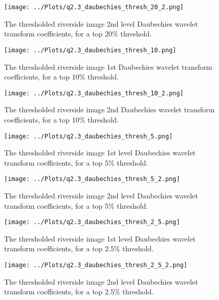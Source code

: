 \documentclass[12pt]{report} %
\begin{document}
\begin{figure}[htbp]
    \centering
    \texttt{[image: ../Plots/q2.3\_daubechies\_thresh\_20\_2.png]}
    \caption{The thresholded riverside image 2nd level Daubechies wavelet transform coefficients, for a top 20\% threshold.}
    \label{fig:thresholded_image20_2}
\end{figure}

\begin{figure}[htbp]
    \centering
    \texttt{[image: ../Plots/q2.3\_daubechies\_thresh\_10.png]}
    \caption{The thresholded riverside image 1st Daubechies wavelet transform coefficients, for a top 10\% threshold.}
    \label{fig:thresholded_image10}
\end{figure}

\begin{figure}[htbp]
    \centering
    \texttt{[image: ../Plots/q2.3\_daubechies\_thresh\_10\_2.png]}
    \caption{The thresholded riverside image 2nd Daubechies wavelet transform coefficients, for a top 10\% threshold.}
    \label{fig:thresholded_image10_2}
\end{figure}

\begin{figure}[htbp]
    \centering
    \texttt{[image: ../Plots/q2.3\_daubechies\_thresh\_5.png]}
    \caption{The thresholded riverside image 1st level Daubechies wavelet transform coefficients, for a top 5\% threshold.}
    \label{fig:thresholded_image5}
\end{figure}

\begin{figure}[htbp]
    \centering
    \texttt{[image: ../Plots/q2.3\_daubechies\_thresh\_5\_2.png]}
    \caption{The thresholded riverside image 2nd level Daubechies wavelet transform coefficients, for a top 5\% threshold.}
    \label{fig:thresholded_image5_2}
\end{figure}

\begin{figure}[htbp]
    \centering
    \texttt{[image: ../Plots/q2.3\_daubechies\_thresh\_2\_5.png]}
    \caption{The thresholded riverside image 1st level Daubechies wavelet transform coefficients, for a top 2.5\% threshold.}
    \label{fig:thresholded_image2.5}
\end{figure}

\begin{figure}[htbp]
    \centering
    \texttt{[image: ../Plots/q2.3\_daubechies\_thresh\_2\_5\_2.png]}
    \caption{The thresholded riverside image 2nd level Daubechies wavelet transform coefficients, for a top 2.5\% threshold.}
    \label{fig:thresholded_image2.5_2}
\end{figure}
\end{document}

